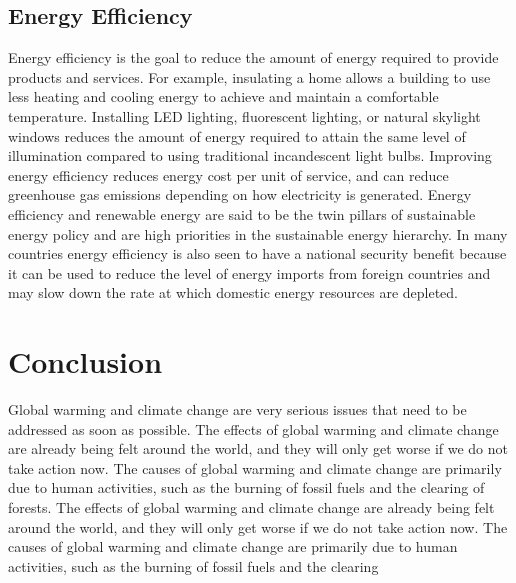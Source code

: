 \documentclass{article}
\begin{document}
\subsection{Energy Efficiency}
Energy efficiency is the goal to reduce the amount of energy required to
provide products and services. For example, insulating a home allows a building
to use less heating and cooling energy to achieve and maintain a comfortable
temperature. Installing LED lighting, fluorescent lighting, or natural skylight
windows reduces the amount of energy required to attain the same level of
illumination compared to using traditional incandescent light bulbs. Improving
energy efficiency reduces energy cost per unit of service, and can reduce
greenhouse gas emissions depending on how electricity is generated. Energy
efficiency and renewable energy are said to be the twin pillars of sustainable
energy policy and are high priorities in the sustainable energy hierarchy. In
many countries energy efficiency is also seen to have a national security
benefit because it can be used to reduce the level of energy imports from
foreign countries and may slow down the rate at which domestic energy resources
are depleted.

\section{Conclusion}
Global warming and climate change are very serious issues that need to be
addressed as soon as possible. The effects of global warming and climate change
are already being felt around the world, and they will only get worse if we do
not take action now. The causes of global warming and climate change are
primarily due to human activities, such as the burning of fossil fuels and the
clearing of forests. The effects of global warming and climate change are
already being felt around the world, and they will only get worse if we do not
take action now. The causes of global warming and climate change are primarily
due to human activities, such as the burning of fossil fuels and the clearing
\end{document}
